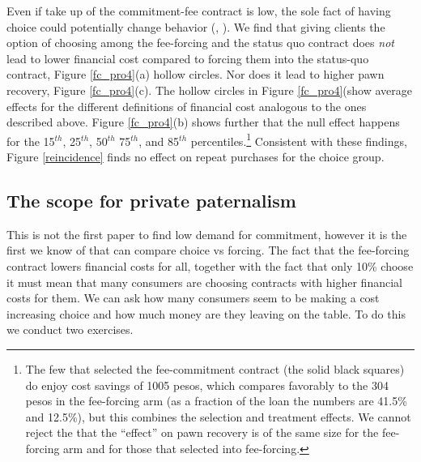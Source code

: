 \documentclass[11pt]{article}
\begin{document}
Even if take up of the commitment-fee contract is low, the sole fact of having choice could potentially change behavior (\cite{Dalboetal:2010}, \cite{Sjostrometal:2018}). We find that giving clients the option of choosing among the fee-forcing and the status quo contract does \textit{not} lead to lower financial cost compared to forcing them into the status-quo contract, Figure \ref{fc_pro4}(a) hollow circles. Nor does it lead to higher pawn recovery, Figure \ref{fc_pro4}(c). The hollow circles in Figure \ref{fc_pro4}(show average effects for the different definitions of financial cost analogous to the ones described above. Figure \ref{fc_pro4}(b) shows further that the null effect happens for the 15$^{th}$, 25$^{th}$, 50$^{th}$ 75$^{th}$, and 85$^{th}$ percentiles.\footnote{The few that selected the fee-commitment contract (the solid black squares) do enjoy cost savings of 1005 pesos, which compares favorably to the 304 pesos in the fee-forcing arm (as a fraction of the loan the numbers are 41.5\% and 12.5\%), but this combines the selection and treatment effects. We cannot reject the that the ``effect'' on pawn recovery is of the same size for the fee-forcing arm and for those that selected into fee-forcing.} %
Consistent with these findings, Figure \ref{reincidence} finds no effect on repeat purchases for the choice group. 



\subsection{The scope for private paternalism}
    
This is not the first paper to find low demand for commitment, however it is the first we know of that can compare choice vs forcing. The fact that the fee-forcing contract lowers financial costs for all, together with the fact that only 10\% choose it must mean that many consumers are choosing contracts with higher financial costs for them. We can ask how many consumers seem to be making a cost increasing choice and how much money are they leaving on the table. To do this we conduct two exercises. 
\end{document}

